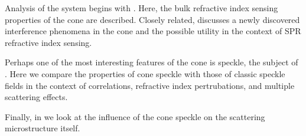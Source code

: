 Analysis of the system begins with .  Here, the bulk
refractive index sensing properties of the cone are described.  Closely
related,  discusses a newly discovered
interference phenomena in the cone and the possible utility in the context
of SPR refractive index sensing.

Perhaps one of the most interesting features of the cone is speckle, the
subject of .  Here we compare the properties of cone
speckle with those of classic speckle fields in the context of
correlations, refractive index pertrubations, and multiple scattering
effects.

Finally, in  we look at the influence of the cone
speckle on the scattering microstructure itself.
